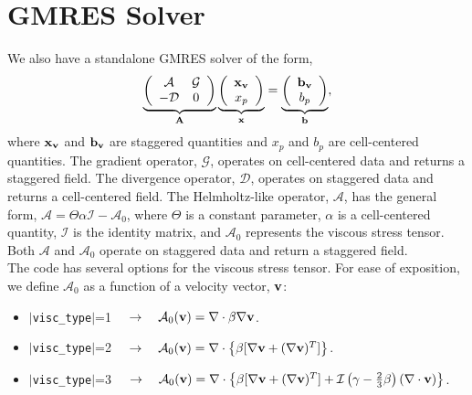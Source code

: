 \documentclass[final]{siamltex}
\def\Ab {{\bf A}}
\def\bb {{\bf b}}
\def\vb {{\bf v}}
\def\xb {{\bf x}}
\begin{document}
\section{GMRES Solver}
We also have a standalone GMRES solver of the form,
\begin{equation}
\underbrace{
\left(\begin{array}{cc}
\mathcal{A} & \mathcal{G} \\
-\mathcal{D} & 0
\end{array}\right)
}_{\Ab}
\underbrace{
\left(\begin{array}{c}
\xb_{\vb} \\
x_p
\end{array}\right)
}_{\xb}
=
\underbrace{
\left(\begin{array}{c}
\bb_{\vb}\\
b_p
\end{array}\right)}_{\bb},
\end{equation}
where $\xb_\vb$ and $\bb_\vb$ are staggered quantities and $x_p$ and $b_p$ are
cell-centered quantities.  The gradient operator, $\mathcal{G}$, operates on
cell-centered data and returns a staggered field.  The divergence operator, 
$\mathcal{D}$, operates on staggered data and returns a cell-centered field.  
The Helmholtz-like operator, $\mathcal{A}$, has the general form,
$\mathcal{A} = \Theta\alpha\mathcal{I} - \mathcal{A}_0$, where
$\Theta$ is a constant parameter,
$\alpha$ is a cell-centered quantity,
$\mathcal{I}$ is the identity matrix, 
and $\mathcal{A}_0$ represents the viscous stress tensor.
Both $\mathcal{A}$ and $\mathcal{A}_0$ operate on staggered data and return
a staggered field.\\

The code has several options for the viscous stress tensor.  For ease of exposition,
we define $\mathcal{A}_0$ as a function of a velocity vector, $\vb$:\\
\begin{itemize}
\item $|${\tt visc\_type}$|$=1 $\quad\rightarrow\quad \mathcal{A}_0(\vb) = \nabla\cdot\beta\nabla\vb$.\\
\item $|${\tt visc\_type}$|$=2 $\quad\rightarrow\quad \mathcal{A}_0(\vb) = \nabla\cdot\left\{\beta[\nabla\vb + (\nabla\vb)^T]\right\}$.\\
\item $|${\tt visc\_type}$|$=3 $\quad\rightarrow\quad \mathcal{A}_0(\vb) = \nabla\cdot\left\{\beta[\nabla\vb + (\nabla\vb)^T] + \mathcal{I}\left(\gamma - \frac{2}{3}\beta\right)(\nabla\cdot\vb)\right\}$.\\
\end{itemize}
\end{document}
